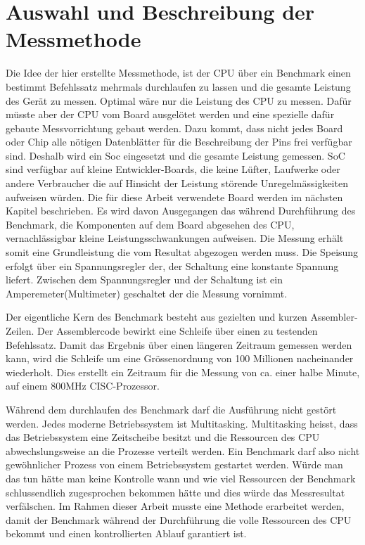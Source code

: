 \section{Auswahl und Beschreibung der Messmethode}

Die Idee der hier erstellte Messmethode, ist der CPU über ein Benchmark einen bestimmt Befehlssatz mehrmals durchlaufen zu lassen und die gesamte Leistung des Gerät zu messen. Optimal wäre nur die Leistung des CPU zu messen. Dafür müsste aber der CPU vom Board ausgelötet werden und eine spezielle dafür gebaute Messvorrichtung gebaut werden. Dazu kommt, dass nicht jedes Board oder Chip alle nötigen Datenblätter für die Beschreibung der Pins frei verfügbar sind. Deshalb wird ein Soc eingesetzt und die gesamte Leistung gemessen. SoC sind verfügbar auf kleine Entwickler-Boards, die keine Lüfter, Laufwerke oder andere Verbraucher die  auf Hinsicht der Leistung störende Unregelmässigkeiten aufweisen würden. Die für diese Arbeit verwendete Board werden im nächsten Kapitel beschrieben. Es wird davon Ausgegangen das während Durchführung des Benchmark, die Komponenten auf dem Board abgesehen des CPU, vernachlässigbar kleine Leistungsschwankungen aufweisen. Die Messung erhält somit eine Grundleistung die vom Resultat abgezogen werden muss. Die Speisung erfolgt über ein Spannungsregler der, der Schaltung eine konstante Spannung liefert. Zwischen dem Spannungsregler und der Schaltung ist ein Amperemeter(Multimeter) geschaltet der die Messung vornimmt.
\par
Der eigentliche Kern des Benchmark besteht aus gezielten und kurzen Assembler-Zeilen. Der Assemblercode bewirkt eine Schleife über einen zu testenden Befehlssatz. Damit das Ergebnis über einen längeren Zeitraum gemessen werden kann, wird die Schleife um eine Grössenordnung von 100 Millionen nacheinander wiederholt. Dies erstellt ein Zeitraum für die Messung von ca. einer halbe Minute, auf einem 800MHz CISC-Prozessor.
\par
Während dem durchlaufen des Benchmark darf die Ausführung nicht gestört werden. Jedes moderne Betriebssystem ist Multitasking. Multitasking heisst, dass das Betriebssystem eine Zeitscheibe besitzt und die Ressourcen des CPU abwechslungsweise an die Prozesse verteilt werden. Ein Benchmark darf also nicht gewöhnlicher Prozess von einem Betriebssystem gestartet werden. Würde man das tun hätte man keine Kontrolle wann und wie viel Ressourcen der Benchmark schlussendlich zugesprochen bekommen hätte und dies würde das Messresultat verfälschen. Im Rahmen dieser Arbeit musste eine Methode erarbeitet werden, damit der Benchmark während der Durchführung die volle Ressourcen des CPU bekommt und einen kontrollierten Ablauf garantiert ist.
